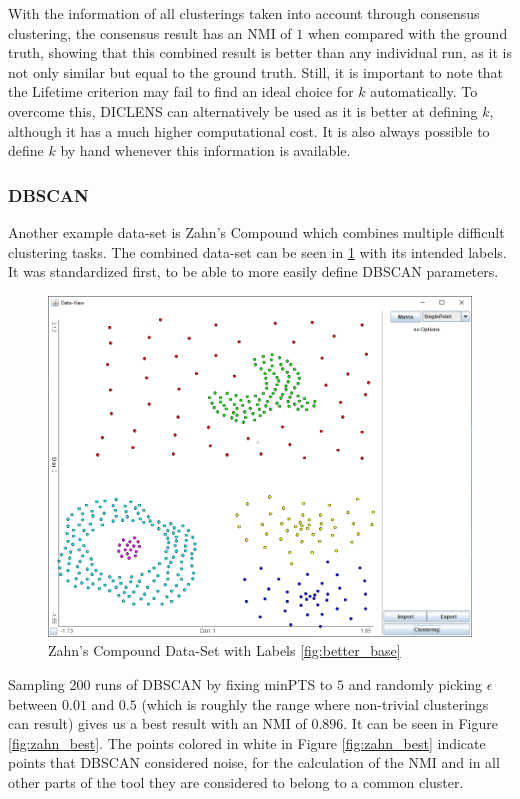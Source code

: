 \documentclass[
	a4paper,
	english,
	twoside,
	openright,               
	11pt                            
	]{report}
\begin{document}
With the information of all clusterings taken into account through consensus clustering, the consensus result has an NMI of $1$ when compared with the ground truth, showing that this combined result is better than any individual run, as it is not only similar but equal to the ground truth. Still, it is important to note that the Lifetime criterion may fail to find an ideal choice for $k$ automatically. To overcome this, DICLENS can alternatively be used as it is better at defining $k$, although it has a much higher computational cost. It is also always possible to define $k$ by hand whenever this information is available.

\subsubsection{DBSCAN}
Another example data-set is Zahn's Compound \cite{1671676} which combines multiple difficult clustering tasks. The combined data-set can be seen in \ref{fig:zahn} with its intended labels. It was standardized first, to be able to more easily define DBSCAN parameters.

\begin{figure}[h]
	\centering
	\includegraphics[scale=.4]{zahn}
	\caption{Zahn's Compound Data-Set with Labels \ref{fig:better_base}}
	\label{fig:zahn}
\end{figure}

Sampling 200 runs of DBSCAN by fixing minPTS to $5$ and randomly picking $\epsilon$ between $0.01$ and $0.5$ (which is roughly the range where non-trivial clusterings can result) gives us a best result with an NMI of $0.896$. It can be seen in Figure \ref{fig:zahn_best}. The points colored in white in Figure \ref{fig:zahn_best} indicate points that DBSCAN considered noise, for the calculation of the NMI and in all other parts of the tool they are considered to belong to a common cluster.
\end{document}
